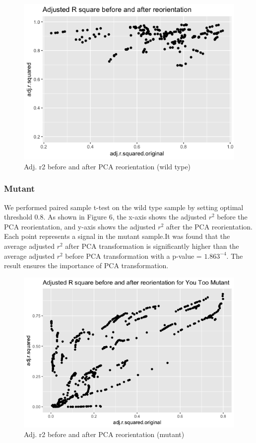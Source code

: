 \documentclass[10pt,letterpaper]{article}
\begin{document}
\begin{figure}
\includegraphics[width=0.9\linewidth]{visualization_paper/r2_ro_comparison_wt} \caption{Adj. r2 before and after PCA reorientation (wild type)}\label{fig:Figure5}
\end{figure}

\hypertarget{mutant-1}{%
\subsubsection{Mutant}\label{mutant-1}}

We performed paired sample t-test on the wild type sample by setting
optimal threshold 0.8. As shown in Figure 6, the x-axis shows the
adjusted \(r^2\) before the PCA reorientation, and y-axis shows the
adjusted \(r^2\) after the PCA reorientation. Each point represents a
signal in the mutant sample.It was found that the average adjusted
\(r^2\) after PCA transformation is significantly higher than the
average adjusted \(r^2\) before PCA transformation with a p-value =
\(1.863^{-4}\). The result ensures the importance of PCA transformation.

\begin{figure}
\includegraphics[width=0.9\linewidth]{visualization_paper/r2_ro_comparison_yt} \caption{Adj. r2 before and after PCA reorientation (mutant)}\label{fig:Figure6}
\end{figure}
\end{document}
